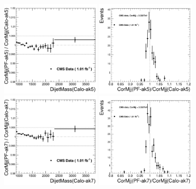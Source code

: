 \begin{figure}[!ht]
  \begin{center}
    \includegraphics[width=0.45\textwidth]{Figures/c_DijetMass_PF_wrt_Calo_ak5.pdf}
    \includegraphics[width=0.45\textwidth]{Figures/c_DijetMass_PF_wrt_Calo_2p3TeV_ak5.pdf}
    \includegraphics[width=0.45\textwidth]{Figures/c_DijetMass_PF_wrt_Calo_ak7.pdf}
    \includegraphics[width=0.45\textwidth]{Figures/c_DijetMass_PF_wrt_Calo_2p3TeV_ak7.pdf}

\end{center}
\end{figure}
